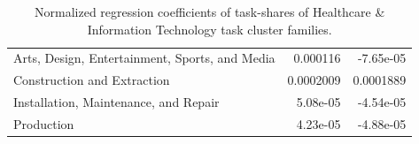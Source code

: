\documentclass[letterpaper]{article} %
\begin{document}
\begin{table}[h!]
\begin{tabular}{l | r | r}
 Arts, Design, Entertainment, Sports, and Media &    0.000116 &              -7.65e-05 \\
           Construction and Extraction          &   0.0002009 &              0.0001889 \\
 Installation, Maintenance, and Repair          &    5.08e-05 &              -4.54e-05 \\
                            Production          &    4.23e-05 &              -4.88e-05 \\
\hline
\end{tabular}
\caption{Normalized regression coefficients of task-shares of Healthcare \& Information Technology task cluster families. 
\label{table:SCF_healthcare_IT_coeff} }
\end{table}

\end{document}
